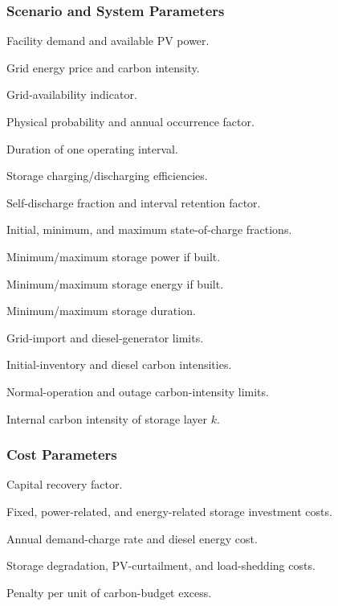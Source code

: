 \documentclass[times]{elsarticle}
\newenvironment{manuscriptdescription}
  {\begin{description}[style=multiline,leftmargin=4.8cm,labelwidth=4.5cm,align=left]}
  {\end{description}}
\begin{document}
\subsubsection*{Scenario and System Parameters}
\begin{manuscriptdescription}
\item[$D_{s,t},P^{\mathrm{PV,av}}_{s,t}$] Facility demand and available PV power.
\item[$\lambda_{s,t},\chi_{s,t}$] Grid energy price and carbon intensity.
\item[$A_{s,t}$] Grid-availability indicator.
\item[$\pi_s,\nu_s$] Physical probability and annual occurrence factor.
\item[$\Delta t$] Duration of one operating interval.
\item[$\eta^{\mathrm{ch}},\eta^{\mathrm{dc}}$] Storage charging/discharging efficiencies.
\item[$\sigma^{\mathrm{sd}},\kappa$] Self-discharge fraction and interval retention
factor.
\item[$\sigma^0,\underline\sigma,\overline\sigma$] Initial, minimum, and maximum
state-of-charge fractions.
\item[$\underline P^{\mathrm{ES}},\overline P^{\mathrm{ES}}$] Minimum/maximum
storage power if built.
\item[$\underline E^{\mathrm{ES}},\overline E^{\mathrm{ES}}$] Minimum/maximum
storage energy if built.
\item[$\underline h,\overline h$] Minimum/maximum storage duration.
\item[$\overline P^{\mathrm G},\overline P^{\mathrm{DG}}$] Grid-import and
diesel-generator limits.
\item[$\chi^0,\chi^{\mathrm{DG}}$] Initial-inventory and diesel carbon intensities.
\item[$\bar\chi^{\mathrm n},\bar\chi^{\mathrm o}$] Normal-operation and outage
carbon-intensity limits.
\item[$\chi^{\mathrm{ES}}_{s,k}$] Internal carbon intensity of storage layer $k$.
\end{manuscriptdescription}

\subsubsection*{Cost Parameters}
\begin{manuscriptdescription}
\item[$\mathrm{CRF}$] Capital recovery factor.
\item[$c^{\mathrm{site}},c^P,c^E$] Fixed, power-related, and energy-related
storage investment costs.
\item[$c^{\mathrm{dem}},c^{\mathrm{DG}}$] Annual demand-charge rate and diesel
energy cost.
\item[$c^{\mathrm{deg}},c^{\mathrm{cur}},c^{\mathrm{sh}}$] Storage degradation,
PV-curtailment, and load-shedding costs.
\item[$c^{\mathrm{exc}}$] Penalty per unit of carbon-budget excess.
\end{manuscriptdescription}
\end{document}
